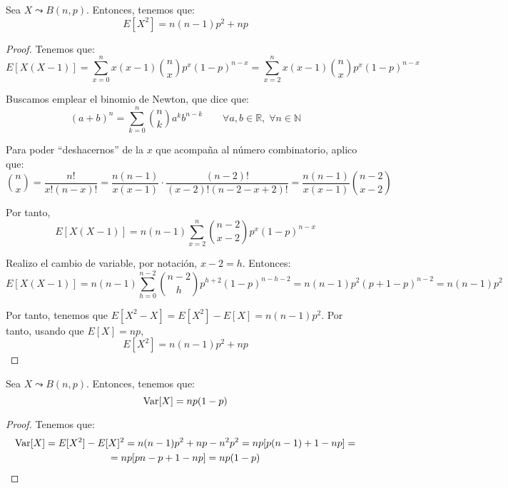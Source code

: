 \begin{lema}
    Sea $X\leadsto B(n,p)$. Entonces, tenemos que:
    \begin{equation*}
        E[X^2] = n(n-1)p^2+np
    \end{equation*}
\end{lema}
\begin{proof}
    Tenemos que:
    \begin{equation*}
        E[X(X-1)] = \sum_{x=0}^n x(x-1) \binom{n}{x}p^x (1-p)^{n-x} = \sum_{x=2}^n x(x-1)\binom{n}{x}p^x (1-p)^{n-x}
    \end{equation*}

    Buscamos emplear el binomio de Newton, que dice que:
    \begin{equation*}
        (a+b)^n = \sum_{k=0}^n \binom{n}{k} a^kb^{n-k} \qquad \forall a,b\in \mathbb{R}, \;\forall n\in \mathbb{N}
    \end{equation*}

    Para poder ``deshacernos'' de la $x$ que acompaña al número combinatorio, aplico que:
    \begin{equation*}
        \binom{n}{x} = \frac{n!}{x!(n-x)!} = \frac{n(n-1)}{x(x-1)}\cdot \frac{(n-2)!}{(x-2)!(n-2-x+2)!} = \frac{n(n-1)}{x(x-1)}\binom{n-2}{x-2}
    \end{equation*}

    Por tanto,
    \begin{equation*}
        E[X(X-1)] = n(n-1) \sum_{x=2}^n \binom{n-2}{x-2}p^x (1-p)^{n-x}
    \end{equation*}

    Realizo el cambio de variable, por notación, $x-2=h$. Entonces:
    \begin{equation*}
        E[X(X-1)] = n(n-1) \sum_{h=0}^{n-2} \binom{n-2}{h}p^{h+2} (1-p)^{n-h-2} = n(n-1)p^2(p+1-p)^{n-2} = n(n-1)p^2
    \end{equation*}

    Por tanto, tenemos que $E[X^2-X]=E[X^2]-E[X] = n(n-1)p^2$. Por tanto, usando que $E[X]=np$,
    \begin{equation*}
        E[X^2]=n(n-1)p^2+np
    \end{equation*}
    
\end{proof}

\begin{coro}
    Sea $X\leadsto B(n,p)$. Entonces, tenemos que:
    \begin{equation*}
        \operatorname{Var}[X] = np(1-p)
    \end{equation*}
\end{coro}
\begin{proof}
    Tenemos que:
    \begin{multline*}
        \operatorname{Var}[X] = E[X^2] - E[X]^2 = n(n-1)p^2 +np -n^2p^2 =np[p(n-1)+1-np] =\\= np[pn-p+1-np] = np(1-p)
    \end{multline*}
    
\end{proof}

